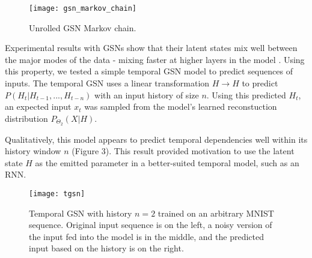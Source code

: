 \begin{figure}[h!]
  \centering
    \texttt{[image: gsn\_markov\_chain]}
\caption{Unrolled GSN Markov chain.}
\end{figure}

Experimental results with GSNs show that their latent states mix well between the major modes of the data - mixing faster at higher layers in the model \cite{gsn}. Using this property, we tested a simple temporal GSN model to predict sequences of inputs. The temporal GSN uses a linear transformation \(H \rightarrow H\) to predict \(P(H_t|H_{t-1},...,H_{t-n})\) with an input history of size \(n\). Using this predicted \(H_t\), an expected input \(x_t\) was sampled from the model's learned reconstuction distribution \(P_{\Theta_2}(X|H)\).

Qualitatively, this model appears to predict temporal dependencies well within its history window \(n\) (Figure 3). This result provided motivation to use the latent state \(H\) as the emitted parameter in a better-suited temporal model, such as an RNN.

\begin{figure}[h!]
  \centering
    \texttt{[image: tgsn]}
\caption{Temporal GSN with history \(n=2\) trained on an arbitrary MNIST sequence. Original input sequence is on the left, a noisy version of the input fed into the model is in the middle, and the predicted input based on the history is on the right.}
\end{figure}
